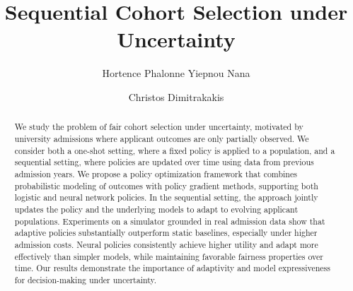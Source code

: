 \documentclass[acmlarge]{acmart-ecaf}
\begin{document}
\title{Sequential Cohort Selection under Uncertainty}



\author{Hortence Phalonne Yiepnou Nana}

\author{Christos Dimitrakakis}




\begin{abstract}
We study the problem of fair cohort selection under uncertainty, motivated by university admissions where applicant outcomes are only partially observed. We consider both a one-shot setting, where a fixed policy is applied to a population, and a sequential setting, where policies are updated over time using data from previous admission years.
We propose a policy optimization framework that combines probabilistic modeling of outcomes with policy gradient methods, supporting both logistic and neural network policies. In the sequential setting, the approach jointly updates the policy and the underlying models to adapt to evolving applicant populations.
Experiments on a simulator grounded in real admission data show that adaptive policies substantially outperform static baselines, especially under higher admission costs. Neural policies consistently achieve higher utility and adapt more effectively than simpler models, while maintaining favorable fairness properties over time. Our results demonstrate the importance of adaptivity and model expressiveness for decision-making under uncertainty.
\end{abstract}
\end{document}
